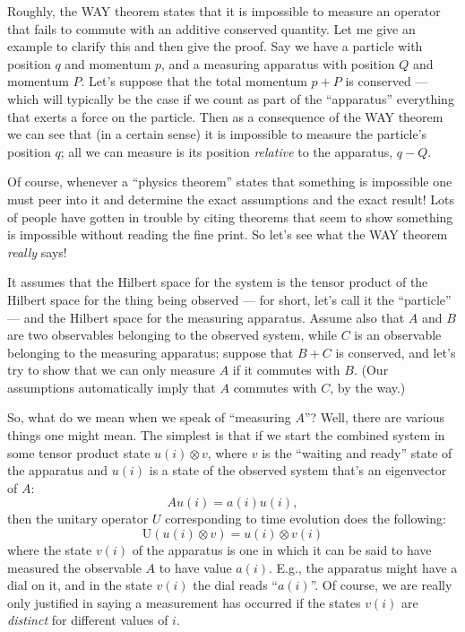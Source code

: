 \documentclass[12pt]{article}
\begin{document}
Roughly, the WAY theorem states that it is impossible to measure an
operator that fails to commute with an additive conserved quantity. Let
me give an example to clarify this and then give the proof. Say we have
a particle with position \(q\) and momentum \(p\), and a measuring
apparatus with position \(Q\) and momentum \(P\). Let's suppose that the
total momentum \(p + P\) is conserved --- which will typically be the
case if we count as part of the ``apparatus'' everything that exerts a
force on the particle. Then as a consequence of the WAY theorem we can
see that (in a certain sense) it is impossible to measure the particle's
position \(q\); all we can measure is its position \emph{relative} to
the apparatus, \(q-Q\).

Of course, whenever a ``physics theorem'' states that something is
impossible one must peer into it and determine the exact assumptions and
the exact result! Lots of people have gotten in trouble by citing
theorems that seem to show something is impossible without reading the
fine print. So let's see what the WAY theorem \emph{really} says!

It assumes that the Hilbert space for the system is the tensor product
of the Hilbert space for the thing being observed --- for short, let's
call it the ``particle'' --- and the Hilbert space for the measuring
apparatus. Assume also that \(A\) and \(B\) are two observables
belonging to the observed system, while \(C\) is an observable belonging
to the measuring apparatus; suppose that \(B + C\) is conserved, and
let's try to show that we can only measure \(A\) if it commutes with
\(B\). (Our assumptions automatically imply that \(A\) commutes with
\(C\), by the way.)

So, what do we mean when we speak of ``measuring \(A\)''? Well, there
are various things one might mean. The simplest is that if we start the
combined system in some tensor product state \(u(i) \otimes v\), where
\(v\) is the ``waiting and ready'' state of the apparatus and \(u(i)\)
is a state of the observed system that's an eigenvector of \(A\):
\[Au(i) = a(i)u(i),\] then the unitary operator \(U\) corresponding to
time evolution does the following:
\[\mathrm{U}(u(i) \otimes v) = u(i) \otimes v(i)\] where the state
\(v(i)\) of the apparatus is one in which it can be said to have
measured the observable \(A\) to have value \(a(i)\). E.g., the
apparatus might have a dial on it, and in the state \(v(i)\) the dial
reads ``\(a(i)\)''. Of course, we are really only justified in saying a
measurement has occurred if the states \(v(i)\) are \emph{distinct} for
different values of \(i\).
\end{document}
